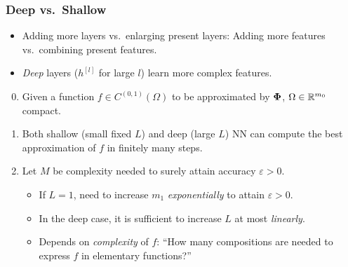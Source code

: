 \documentclass[10pt,hyperref={pdfpagelabels=false}]{beamer}
\begin{document}
\begin{frame}
    \frametitle{Deep vs.~Shallow}
    \begin{itemize}
        \item Adding more layers vs.~enlarging present layers: Adding more features vs.~combining present features.
        \item \emph{Deep} layers ($h^{[l]}$ for large $l$) learn more complex features.
    \end{itemize}
    \begin{theorem}
        \begin{enumerate}
            \setcounter{enumi}{-1}
            \item Given a function $f\in C^{(0,1)}(\Omega)$ to be approximated by $\boldsymbol{\Phi}$, $\Omega\in\mathbb{R}^{m_0}$ compact.
            \item Both shallow (small fixed $L$) and deep (large $L$) NN can compute the best approximation of $f$ in finitely many steps.
            \item Let $M$ be complexity needed to surely attain accuracy $\varepsilon>0$.
                \begin{itemize}
                    \item If $L=1$, need to increase $m_1$ \emph{exponentially} to attain $\varepsilon>0$.
                    \item In the deep case, it is sufficient to increase $L$ at most \emph{linearly}.
                    \item Depends on \emph{complexity} of $f$: ``How many compositions are needed to express $f$ in elementary functions?''
                \end{itemize}
        \end{enumerate}
    \end{theorem}
\end{frame}
\end{document}
